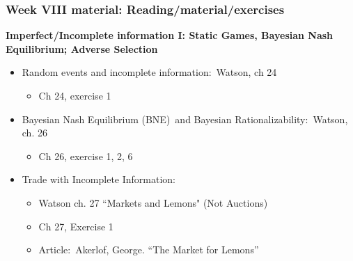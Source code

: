 \documentclass[handout]{beamer}
\begin{document}
\begin{frame}%

\frametitle{\textbf{Week VIII material: Reading/material/exercises}}

\textbf{Imperfect/Incomplete information I: Static Games, Bayesian Nash
Equilibrium; Adverse Selection}

\begin{itemize}
\item Random events and incomplete information:\ Watson, ch 24

\begin{itemize}
\item Ch 24, exercise 1
\end{itemize}

\item Bayesian Nash Equilibrium (BNE)\ {\small and Bayesian
Rationalizability:\ }Watson, ch. 26

\begin{itemize}
\item Ch 26, exercise 1, 2, 6
\end{itemize}

\item Trade with Incomplete Information:

\begin{itemize}
\item Watson ch. 27 \textquotedblleft Markets and Lemons" (Not Auctions)

\item Ch 27, Exercise 1

\item Article:\ Akerlof, George. \textquotedblleft The Market for
Lemons\textquotedblright\ 
\end{itemize}
\end{itemize}

\end{frame}%
\end{document}
